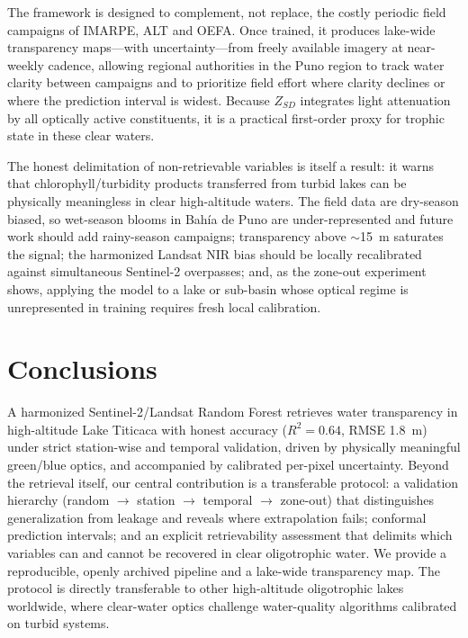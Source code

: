 \documentclass[remotesensing,article,submit,pdftex,moreauthors]{Definitions/mdpi}
\begin{document}
The framework is designed to complement, not replace, the costly periodic field
campaigns of IMARPE, ALT and OEFA. Once trained, it produces lake-wide transparency
maps---with uncertainty---from freely available imagery at near-weekly cadence,
allowing regional authorities in the Puno region to track water clarity between
campaigns and to prioritize field effort where clarity declines or where the
prediction interval is widest. Because $Z_{SD}$ integrates light attenuation by all
optically active constituents, it is a practical first-order proxy for trophic
state in these clear waters.

The honest delimitation of non-retrievable variables is itself a result: it warns
that chlorophyll/turbidity products transferred from turbid lakes can be physically
meaningless in clear high-altitude waters. The field data are dry-season biased, so
wet-season blooms in Bah\'ia de Puno are under-represented and future work should
add rainy-season campaigns; transparency above $\sim$15~m saturates the signal; the
harmonized Landsat NIR bias should be locally recalibrated against simultaneous
Sentinel-2 overpasses; and, as the zone-out experiment shows, applying the model to
a lake or sub-basin whose optical regime is unrepresented in training requires
fresh local calibration.

\section{Conclusions}
A harmonized Sentinel-2/Landsat Random Forest retrieves water transparency in
high-altitude Lake Titicaca with honest accuracy ($R^2=0.64$, RMSE 1.8~m) under
strict station-wise and temporal validation, driven by physically meaningful
green/blue optics, and accompanied by calibrated per-pixel uncertainty. Beyond the
retrieval itself, our central contribution is a transferable protocol: a validation
hierarchy (random $\to$ station $\to$ temporal $\to$ zone-out) that distinguishes
generalization from leakage and reveals where extrapolation fails; conformal
prediction intervals; and an explicit retrievability assessment that delimits which
variables can and cannot be recovered in clear oligotrophic water. We provide a
reproducible, openly archived pipeline and a lake-wide transparency map. The
protocol is directly transferable to other high-altitude oligotrophic lakes
worldwide, where clear-water optics challenge water-quality algorithms calibrated
on turbid systems.
\end{document}
